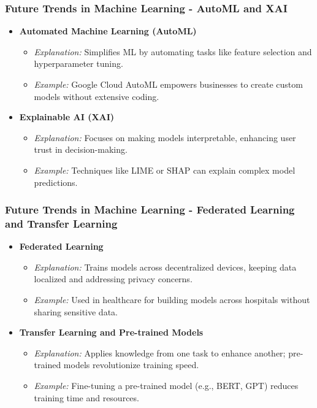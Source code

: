 \documentclass{beamer}
\begin{document}
\begin{frame}[fragile]
    \frametitle{Future Trends in Machine Learning - AutoML and XAI}
    \begin{itemize}
        \item \textbf{Automated Machine Learning (AutoML)}
            \begin{itemize}
                \item \textit{Explanation:} Simplifies ML by automating tasks like feature selection and hyperparameter tuning.
                \item \textit{Example:} Google Cloud AutoML empowers businesses to create custom models without extensive coding.
            \end{itemize}
        
        \item \textbf{Explainable AI (XAI)}
            \begin{itemize}
                \item \textit{Explanation:} Focuses on making models interpretable, enhancing user trust in decision-making.
                \item \textit{Example:} Techniques like LIME or SHAP can explain complex model predictions.
            \end{itemize}
    \end{itemize}
\end{frame}

\begin{frame}[fragile]
    \frametitle{Future Trends in Machine Learning - Federated Learning and Transfer Learning}
    \begin{itemize}
        \item \textbf{Federated Learning}
            \begin{itemize}
                \item \textit{Explanation:} Trains models across decentralized devices, keeping data localized and addressing privacy concerns.
                \item \textit{Example:} Used in healthcare for building models across hospitals without sharing sensitive data.
            \end{itemize}
        
        \item \textbf{Transfer Learning and Pre-trained Models}
            \begin{itemize}
                \item \textit{Explanation:} Applies knowledge from one task to enhance another; pre-trained models revolutionize training speed.
                \item \textit{Example:} Fine-tuning a pre-trained model (e.g., BERT, GPT) reduces training time and resources.
            \end{itemize}
    \end{itemize}
\end{frame}
\end{document}
